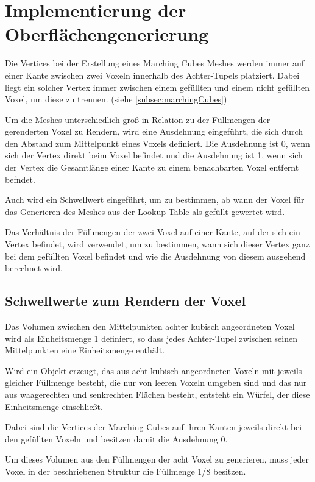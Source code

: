 
\section{Implementierung der  Oberflächengenerierung}
\label{sec:implementierungOberflaeche}
Die Vertices bei der Erstellung eines Marching Cubes Meshes werden immer auf einer Kante zwischen zwei Voxeln innerhalb  des Achter-Tupels platziert. Dabei liegt ein solcher Vertex immer zwischen einem gefüllten und einem nicht gefüllten Voxel, um diese zu trennen. (siehe \ref{subsec:marchingCubes})

Um die Meshes unterschiedlich groß in Relation zu der Füllmengen der gerenderten Voxel zu Rendern, wird eine Ausdehnung eingeführt, die sich durch den Abstand zum Mittelpunkt eines Voxels definiert. Die Ausdehnung ist 0, wenn sich der Vertex direkt beim Voxel befindet und die Ausdehnung ist 1, wenn sich der Vertex die Gesamtlänge einer Kante zu einem benachbarten Voxel entfernt befndet.

Auch wird ein Schwellwert eingeführt, um zu bestimmen, ab wann der Voxel für das Generieren des Meshes aus der Lookup-Table als gefüllt gewertet wird.

Das Verhältnis der Füllmengen der zwei Voxel auf einer Kante, auf der sich ein Vertex befindet, wird verwendet, um zu bestimmen, wann sich dieser Vertex ganz bei dem gefüllten Voxel befindet und wie die Ausdehnung von diesem ausgehend berechnet wird.

\subsection{Schwellwerte zum Rendern der Voxel}
Das Volumen zwischen den Mittelpunkten achter kubisch angeordneten Voxel wird als Einheitsmenge 1 definiert, so dass jedes Achter-Tupel zwischen seinen Mittelpunkten eine Einheitsmenge enthält.

Wird ein Objekt erzeugt, das aus acht kubisch angeordneten Voxeln mit jeweils gleicher Füllmenge besteht, die nur von leeren Voxeln umgeben sind und das nur aus waagerechten und senkrechten Flächen besteht, entsteht ein Würfel, der diese Einheitsmenge einschließt.

Dabei sind die Vertices der Marching Cubes auf ihren Kanten jeweils direkt bei den gefüllten Voxeln und besitzen damit die Ausdehnung 0.

Um dieses Volumen aus den Füllmengen der acht Voxel zu generieren, muss jeder Voxel in der beschriebenen Struktur die Füllmenge 1/8 besitzen.

